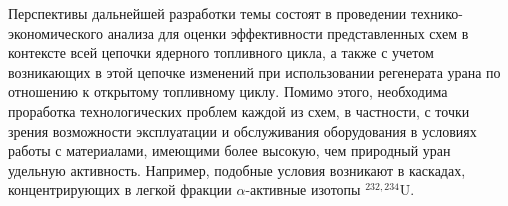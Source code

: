Перспективы дальнейшей разработки темы состоят в проведении технико-экономического анализа для оценки эффективности представленных схем в контексте всей цепочки ядерного топливного цикла, а также с учетом возникающих в этой цепочке изменений при использовании регенерата урана по отношению к открытому топливному циклу. Помимо этого, необходима проработка технологических проблем каждой из схем, в частности, с точки зрения возможности эксплуатации и обслуживания оборудования в условиях работы с материалами, имеющими более высокую, чем природный уран удельную активность. Например, подобные условия возникают в каскадах, концентрирующих в легкой фракции $\alpha$-активные изотопы $^{232,234}$U.



\insertbibliofull   
{}